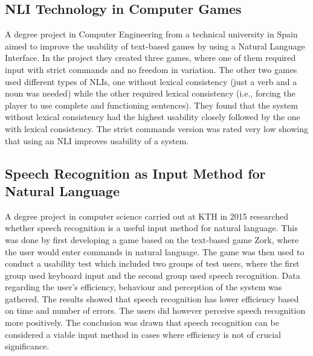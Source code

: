 \subsection{NLI Technology in Computer Games}
A degree project in Computer Engineering from a technical university in Spain aimed to improve the usability of text-based games by using a Natural Language Interface. In the project they created three games, where one of them required input with strict commands and no freedom in variation. The other two games used different types of NLIs, one without lexical consistency (just a verb and a noun was needed) while the other required lexical consistency (i.e., forcing the player to use complete and functioning sentences). They found that the system without lexical consistency had the highest usability closely followed by the one with lexical consistency. The strict commands version was rated very low showing that using an NLI improves usability of a system. \citep{Memo}

\subsection{Speech Recognition as Input Method for Natural Language}
A degree project in computer science carried out at KTH in 2015 researched whether speech recognition is a useful input method for natural language. This was done by first developing a game based on the text-based game Zork, where the user would enter commands in natural language. The game was then used to conduct a usability test which included two groups of test users, where the first group used keyboard input and the second group used speech recognition. Data regarding the user's efficiency, behaviour and perception of the system was gathered. The results showed that speech recognition has lower efficiency based on time and number of errors. The users did however perceive speech recognition more positively. The conclusion was drawn that speech recognition can be considered a viable input method in cases where efficiency is not of crucial significance. \citep{qvar}